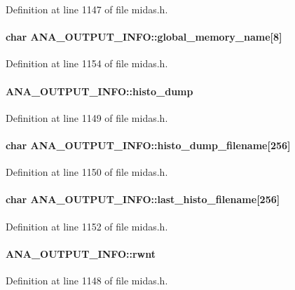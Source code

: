 Definition at line 1147 of file midas.h.
\paragraph[{global\_\-memory\_\-name}]{\setlength{\rightskip}{0pt plus 5cm}char {\bf ANA\_\-OUTPUT\_\-INFO::global\_\-memory\_\-name}\mbox{[}8\mbox{]}}\hfill\label{structANA__OUTPUT__INFO_a5b83554691d81a0de4ed1e4c8068f609}


Definition at line 1154 of file midas.h.
\paragraph[{histo\_\-dump}]{ {\bf ANA\_\-OUTPUT\_\-INFO::histo\_\-dump}}\hfill\label{structANA__OUTPUT__INFO_a9194f35b214ae6f01b26628716dbb6af}


Definition at line 1149 of file midas.h.
\paragraph[{histo\_\-dump\_\-filename}]{\setlength{\rightskip}{0pt plus 5cm}char {\bf ANA\_\-OUTPUT\_\-INFO::histo\_\-dump\_\-filename}\mbox{[}256\mbox{]}}\hfill\label{structANA__OUTPUT__INFO_a9e245ba3637c0c61848e4837fd9ba021}


Definition at line 1150 of file midas.h.
\paragraph[{last\_\-histo\_\-filename}]{\setlength{\rightskip}{0pt plus 5cm}char {\bf ANA\_\-OUTPUT\_\-INFO::last\_\-histo\_\-filename}\mbox{[}256\mbox{]}}\hfill\label{structANA__OUTPUT__INFO_af8529ff036fd98d5d1eceffd04552ad0}


Definition at line 1152 of file midas.h.
\paragraph[{rwnt}]{ {\bf ANA\_\-OUTPUT\_\-INFO::rwnt}}\hfill\label{structANA__OUTPUT__INFO_a2f38e1072e804dfd552524d6b29300cd}


Definition at line 1148 of file midas.h.